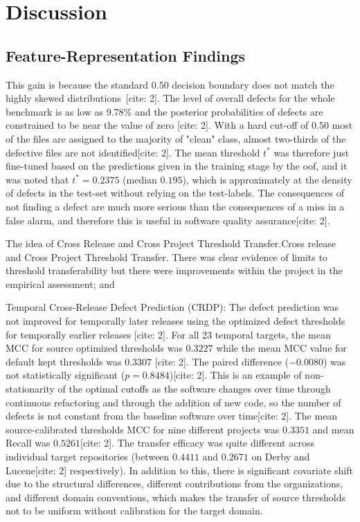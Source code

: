 \documentclass[conference]{IEEEtran}
\begin{document}
\section{Discussion}

\subsection{Feature-Representation Findings}
\label{subsec:feature-representation-findings}

This gain is because the standard $0.50$ decision boundary does not match the highly skewed distributions~\cite{chicco2020mcc, tantithamthavorn2019optimization}[cite: 2]. The level of overall defects for the whole benchmark is as low as 9.78\% and the posterior probabilities of defects are constrained to be near the value of zero [cite: 2]. With a hard cut-off of $0.50$ most of the files are assigned to the majority of "clean" class, almost two-thirds of the defective files are not identified[cite: 2]. The mean threshold $t^*$ was therefore just fine-tuned based on the predictions given in the training stage by the oof, and it was noted that $t^* = 0.2375$ (median $0.195$), which is approximately at the density of defects in the test-set without relying on the test-labels. The consequences of not finding a defect are much more serious than the consequences of a miss in a false alarm, and therefore this is useful in software quality assurance[cite: 2].

The idea of Cross Release and Cross Project Threshold Transfer.Cross release and Cross Project Threshold Transfer.
There was clear evidence of limits to threshold transferability but there were improvements within the project in the empirical assessment; and
\begin{enumerate}
    Temporal Cross-Release Defect Prediction (CRDP): The defect prediction was not improved for temporally later releases using the optimized defect thresholds for temporally earlier releases [cite: 2]. For all 23 temporal targets, the mean MCC for source optimized thresholds was $0.3227$ while the mean MCC value for default kept thresholds was $0.3307$ [cite: 2]. The paired difference ($-0.0080$) was not statistically significant ($p = 0.8484$)[cite: 2]. This is an example of non-stationarity of the optimal cutoffs as the software changes over time through continuous refactoring and through the addition of new code, so the number of defects is not constant from the baseline software over time[cite: 2].
    The mean source-calibrated thresholds MCC for nine different projects was $0.3351$ and mean Recall was $0.5261$[cite: 2]. The transfer efficacy was quite different across individual target repositories (between $0.4411$ and $0.2671$ on Derby and Lucene[cite: 2] respectively). In addition to this, there is significant covariate shift due to the structural differences, different contributions from the organizations, and different domain conventions, which makes the transfer of source thresholds not to be uniform without calibration for the target domain.
\end{enumerate}
\end{document}
